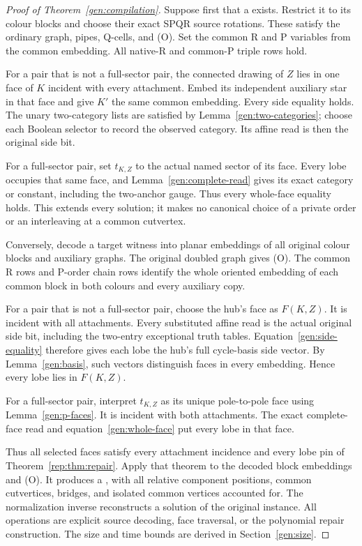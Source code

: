 \begin{proof}[Proof of Theorem~\ref{gen:compilation}]
Suppose first that a \SEFE{} exists.  Restrict it to its colour blocks and
choose their exact SPQR source rotations.  These satisfy the ordinary
graph, pipes, Q-cells, and (O).  Set the common R and P variables from the
common embedding.  All native-R and common-P triple rows hold.

For a pair that is not a full-sector pair, the connected drawing of $Z$
lies in one face of $K$ incident with every attachment.  Embed its
independent auxiliary star in that face and give $K'$ the same common
embedding.  Every side equality holds.  The unary two-category lists are
satisfied by Lemma~\ref{gen:two-categories}; choose each Boolean selector
to record the observed category.  Its affine read is then the original
side bit.

For a full-sector pair, set $t_{K,Z}$ to the actual named sector of its
face.  Every lobe occupies that same face, and
Lemma~\ref{gen:complete-read} gives its exact category or constant,
including the two-anchor gauge.  Thus every whole-face equality holds.
This extends every solution; it makes no canonical choice of a private
order or an interleaving at a common cutvertex.

Conversely, decode a target witness into planar embeddings of all
original colour blocks and auxiliary graphs.  The original doubled graph
gives (O).  The common R rows and P-order chain rows identify the whole
oriented embedding of each common block in both colours and every
auxiliary copy.

For a pair that is not a full-sector pair, choose the hub's face as
$F(K,Z)$.  It is incident with all attachments.  Every substituted affine
read is the actual original side bit, including the two-entry exceptional
truth tables.  Equation~\eqref{gen:side-equality} therefore gives each
lobe the hub's full cycle-basis side vector.  By
Lemma~\ref{gen:basis}, such vectors distinguish faces in every embedding.
Hence every lobe lies in
$F(K,Z)$.

For a full-sector pair, interpret $t_{K,Z}$ as its unique pole-to-pole
face using Lemma~\ref{gen:p-faces}.  It is incident with both attachments.
The exact complete-face read and equation~\eqref{gen:whole-face} put
every lobe in that face.

Thus all selected faces satisfy every attachment incidence and every
lobe pin of Theorem~\ref{rep:thm:repair}.  Apply that theorem to the decoded
block embeddings and (O).  It produces a \SEFE, with all relative
component positions, common cutvertices, bridges, and isolated common
vertices accounted for.  The normalization inverse reconstructs a
solution of the original instance.  All operations are explicit source
decoding, face traversal, or the polynomial repair construction.  The
size and time bounds are derived in Section~\ref{gen:size}.
\end{proof}

